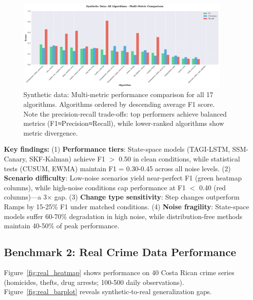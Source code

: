 \documentclass[journal,article,submit,pdftex,moreauthors]{Definitions/mdpi}
\begin{document}
\begin{figure}[H]
\centering
\includegraphics[width=0.95\textwidth]{figures/fig_synthetic_barplot.pdf}
\caption{Synthetic data: Multi-metric performance comparison for all 17 algorithms. Algorithms ordered by descending average F1 score. Note the precision-recall trade-offs: top performers achieve balanced metrics (F1≈Precision≈Recall), while lower-ranked algorithms show metric divergence.}
\label{fig:synthetic_barplot}
\end{figure}

\textbf{Key findings:} (1) \textbf{Performance tiers}: State-space models (TAGI-LSTM, SSM-Canary, SKF-Kalman) achieve F1 $>$ 0.50 in clean conditions, while statistical tests (CUSUM, EWMA) maintain F1 = 0.30-0.45 across all noise levels. (2) \textbf{Scenario difficulty}: Low-noise scenarios yield near-perfect F1 (green heatmap columns), while high-noise conditions cap performance at F1 $<$ 0.40 (red columns)—a 3× gap. (3) \textbf{Change type sensitivity}: Step changes outperform Ramps by 15-25\% F1 under matched conditions. (4) \textbf{Noise fragility}: State-space models suffer 60-70\% degradation in high noise, while distribution-free methods maintain 40-50\% of peak performance.


\subsection{Benchmark 2: Real Crime Data Performance}
\label{sec:results_real}

Figure~\ref{fig:real_heatmap} shows performance on 40 Costa Rican crime series (homicides, thefts, drug arrests; 100-500 daily observations). Figure~\ref{fig:real_barplot} reveals synthetic-to-real generalization gaps.
\end{document}
